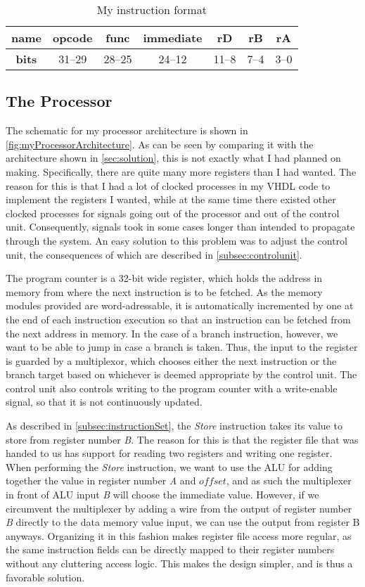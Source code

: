 \documentclass[11pt]{article}
\begin{document}
\begin{table}[htbp]
  \centering
  \begin{tabular}{|c|c|c|c|c|c|c|}
    \hline
    {\bf name} & opcode & func & immediate & rD & rB & rA \\ \hline
    {\bf bits} & 31--29 & 28--25 & 24--12 & 11--8 & 7--4 & 3--0 \\ \hline
  \end{tabular}
  \caption{My instruction format}
  \label{tab:myInstructionFormat}
\end{table}

\subsection{The Processor}
\label{subsec:processor}
The schematic for my processor architecture is shown in
\autoref{fig:myProcessorArchitecture}. As can be seen by comparing it
with the architecture shown in \autoref{sec:solution}, this is not
exactly what I had planned on making. Specifically, there are quite
many more registers than I had wanted. The reason for this is that I
had a lot of clocked processes in my VHDL code to implement the
registers I wanted, while at the same time there existed other clocked
processes for signals going out of the processor and out of the
control unit. Consequently, signals took in some cases longer than
intended to propagate through the system. An easy solution to this
problem was to adjust the control unit, the consequences of which are
described in \autoref{subsec:controlunit}.

The program counter is a 32-bit wide register, which holds the address
in memory from where the next instruction is to be fetched. As the
memory modules provided are word-adressable, it is automatically
incremented by one at the end of each instruction execution so that an
instruction can be fetched from the next address in memory. In the
case of a branch instruction, however, we want to be able to jump in
case a branch is taken.  Thus, the input to the register is guarded by
a multiplexor, which chooses either the next instruction or the branch
target based on whichever is deemed appropriate by the control
unit. The control unit also controls writing to the program counter
with a write-enable signal, so that it is not continuously updated.

As described in \autoref{subsec:instructionSet}, the {\em Store}
instruction takes its value to store from register number {\em B}. The
reason for this is that the register file that was handed to us has
support for reading two registers and writing one register. When
performing the {\em Store} instruction, we want to use the ALU for
adding together the value in register number {\em A} and $offset$, and
as such the multiplexer in front of ALU input {\em B} will choose the
immediate value. However, if we circumvent the multiplexer by adding a
wire from the output of register number {\em B} directly to the data
memory value input, we can use the output from register B
anyways. Organizing it in this fashion makes register file access more
regular, as the same instruction fields can be directly mapped to
their register numbers without any cluttering access logic. This makes
the design simpler, and is thus a favorable solution.
\end{document}
